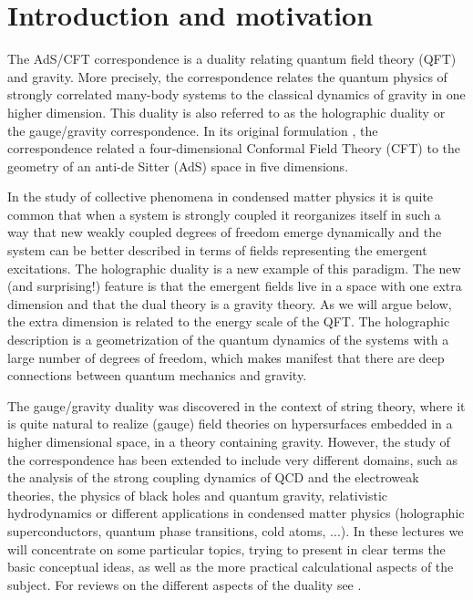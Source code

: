 \documentclass[12pt,notitlepage]{article}
\begin{document}
\newpage

\tableofcontents



\newpage

\section{Introduction and motivation}
\label{sec:1}
The AdS/CFT correspondence is a duality relating quantum field theory (QFT) and gravity. More precisely, the correspondence  relates the quantum physics of strongly correlated many-body systems to the classical dynamics of gravity in one higher dimension. This duality is also referred to as the holographic duality or the gauge/gravity correspondence. In its original formulation \cite{Maldacena:1997re,Gubser:1998bc,Witten:1998qj}, the correspondence related a four-dimensional Conformal Field Theory (CFT) to the geometry of an anti-de Sitter (AdS) space in five dimensions. 

In the study of collective phenomena in condensed matter physics it is quite common that when a system is strongly coupled it reorganizes itself in such a way that new weakly coupled degrees of freedom emerge dynamically and the system can be better described in terms of  fields representing the emergent excitations. The holographic duality is a new example of this paradigm.  The new (and surprising!) feature is that the emergent fields live in a space with one extra dimension and that the dual theory is a gravity theory. As we will argue below, the extra dimension is related to the energy scale of the QFT. The holographic description is a geometrization of the quantum dynamics of the systems with a large number of degrees of freedom, which makes manifest that there are deep connections between quantum mechanics and gravity. 


The gauge/gravity duality was discovered in the context of string theory, where it is quite natural to realize (gauge) field theories on hypersurfaces embedded in a higher dimensional space, in a theory containing gravity.  However, the study of the correspondence  has been extended to include very different domains, such as the analysis of the strong coupling dynamics  of QCD and the electroweak theories, the physics of black holes and quantum gravity, relativistic hydrodynamics or different applications in condensed matter physics (holographic superconductors, quantum phase transitions, cold atoms, ...).  In these lectures we will concentrate on some particular topics, trying to present in clear terms the basic conceptual ideas, as well as the more practical calculational aspects of the subject.  For reviews on the different aspects of the duality see \cite{Aharony:1999ti,D'Hoker:2002aw,Hartnoll:2009sz,McGreevy:2009xe,CasalderreySolana:2011us,Kim:2012ey,Adams:2012th}. 
\end{document}
